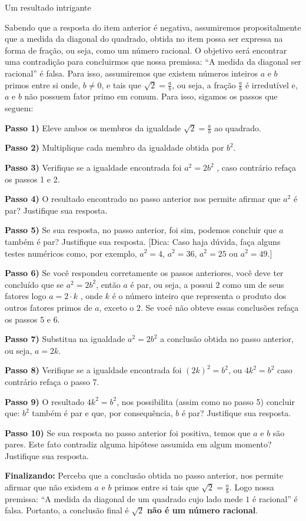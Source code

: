 \begin{task}{Um resultado intrigante}
\begin{enumerate}
Sabendo que a resposta do item anterior é negativa, assumiremos propositalmente que a medida da diagonal do quadrado, obtida no item  possa ser expressa na forma de fração, ou seja, como um número racional. O objetivo será encontrar uma contradição para concluirmos que nossa premissa: “A medida da diagonal ser racional” é falsa. Para isso, assumiremos que existem números inteiros $a$ e $b$ primos entre si onde, $b \neq 0$, e tais que $\sqrt{2}=\frac{a}{b}$, ou seja, a fração $\frac{a}{b}$ é irredutível e, $a$ e $b$ não possuem fator primo em comum. Para isso, sigamos os passos que seguem:

\textbf{Passo 1)} Eleve ambos os membros da igualdade $\sqrt{2} = \frac{a}{b}$ ao quadrado.

\textbf{Passo 2)} Multiplique cada membro da igualdade obtida por $b^2$.

\textbf{Passo 3)} Verifique se a igualdade encontrada foi $a^2=2b^2$ , caso contrário refaça os passos 1 e 2.

\textbf{Passo 4)} O resultado encontrado no passo anterior nos permite afirmar que $a^2$ é par? Justifique sua resposta.

\textbf{Passo 5)} Se sua resposta, no passo anterior, foi sim, podemos concluir que $a$ também é par? Justifique sua resposta. {[}Dica: Caso haja dúvida, faça alguns testes numéricos como, por exemplo, $a^2 = 4$, $a^2 = 36$, $a^2 = 25$ ou $a^2 = 49$.{]}

\textbf{Passo 6)} Se você respondeu corretamente os passos anteriores, você deve ter concluído que se $a^2=2b^2$, então $a$ é par, ou seja, a possui $2$ como um de seus fatores logo $a = 2 \cdot k$ , onde $k$ é o número inteiro que representa o produto dos outros fatores primos de $a$, exceto o $2$. Se você não obteve essas conclusões refaça os passos 5 e 6.

\textbf{Passo 7)} Substitua na igualdade $a^2=2b^2$ a conclusão obtida no passo anterior, ou seja, $a = 2k$.

\textbf{Passo 8)} Verifique se a igualdade encontrada foi $(2k)^2=b^2$, ou $4k^2=b^2$ caso contrário refaça o passo 7.

\textbf{Passo 9)} O resultado $4k^2=b^2$, nos possibilita (assim como no passo 5) concluir que:  $b^2$ também é par e que, por consequência, $b$ é par? Justifique sua resposta.

\textbf{Passo 10)} Se sua resposta no passo anterior foi positiva, temos que $a$ e $b$ são pares. Este fato contradiz alguma hipótese assumida em algum momento? Justifique sua resposta.

\textbf{Finalizando:} Perceba que a conclusão obtida no passo anterior, nos permite afirmar que não existem $a$ e $b$ primos entre si tais que $\displaystyle\sqrt{2} =\frac{a}{b}$. Logo nossa premissa: “A medida da diagonal de um quadrado cujo lado mede $1$ é racional” é falsa. Portanto, a conclusão final é $\sqrt{2}$ \textbf{não é um número racional}.

\end{enumerate}
\end{task}




